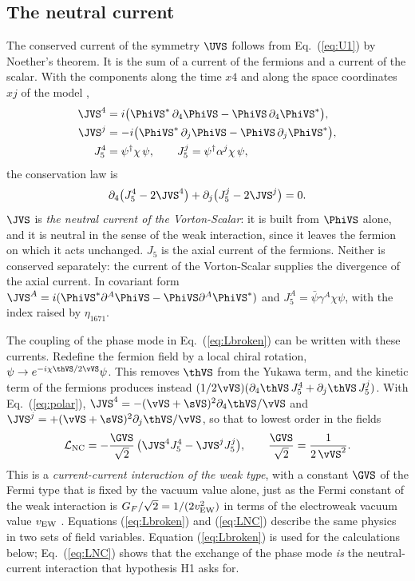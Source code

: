 \subsection{The neutral current}
\label{sec:nc}

The conserved current of the symmetry $\UVS$ follows from Eq.~(\ref{eq:U1}) by Noether's theorem. It
is the sum of a current of the fermions and a current of the scalar. With the components along the
time $x4$ and along the space coordinates $xj$ of the model
,
\begin{align}
\JVS^4&=i\big(\PhiVS^{*}\,\partial_4\PhiVS-\PhiVS\,\partial_4\PhiVS^{*}\big),\nonumber\\
\JVS^j&=-i\big(\PhiVS^{*}\,\partial_j\PhiVS-\PhiVS\,\partial_j\PhiVS^{*}\big),\nonumber\\
J_5^4&=\psi^\dagger\chi\,\psi,\qquad J_5^j=\psi^\dagger\alpha^j\chi\,\psi,
\label{eq:currents}
\end{align}
the conservation law is
\begin{equation}
\partial_4\big(J_5^4-2\JVS^4\big)+\partial_j\big(J_5^j-2\JVS^j\big)=0 .
\label{eq:conservation}
\end{equation}
$\JVS$ is \emph{the neutral current of the Vorton-Scalar}: it is built from $\PhiVS$ alone, and it is
neutral in the sense of the weak interaction, since it leaves the fermion on which it acts unchanged.
$J_5$ is the axial current of the fermions. Neither is conserved separately: the current of the
Vorton-Scalar supplies the divergence of the axial current.
In covariant form $\JVS^A=i(\PhiVS^{*}\partial^A\PhiVS-\PhiVS\partial^A\PhiVS^{*})$ and
$J_5^A=\bar\psi\gamma^A\chi\psi$, with the index raised by $\eta_{1671}$.

The coupling of the phase mode in Eq.~(\ref{eq:Lbroken}) can be written with these currents. Redefine
the fermion field by a local chiral rotation, $\psi\to e^{-i\chi\thVS/2\vVS}\psi$. This removes
$\thVS$ from the Yukawa term, and the kinetic term of the fermions produces instead
$(1/2\vVS)(\partial_4\thVS\,J_5^4+\partial_j\thVS\,J_5^j)$. With Eq.~(\ref{eq:polar}),
$\JVS^4=-(\vVS+\sVS)^2\partial_4\thVS/\vVS$ and $\JVS^j=+(\vVS+\sVS)^2\partial_j\thVS/\vVS$, so that to
lowest order in the fields
\begin{equation}
\mathcal L_{\rm NC}=-\frac{\GVS}{\sqrt2}\,\big(\JVS^4J_5^4-\JVS^jJ_5^j\big),\qquad\frac{\GVS}{\sqrt2}=\frac{1}{2\,\vVS^{2}}.
\label{eq:LNC}
\end{equation}
This is a \emph{current-current interaction of the weak type}, with a constant $\GVS$ of the Fermi type
that is fixed by the vacuum value alone, just as the Fermi constant of the weak interaction is
$G_F/\sqrt2=1/(2v_{\rm EW}^2)$ in terms of the electroweak vacuum value $v_{\rm EW}$
\cite{Weinberg1967}. Equations (\ref{eq:Lbroken}) and (\ref{eq:LNC}) describe the same physics in two
sets of field variables. Equation (\ref{eq:Lbroken}) is used for the calculations below;
Eq.~(\ref{eq:LNC}) shows that the exchange of the phase mode \emph{is} the neutral-current interaction
that hypothesis H1 asks for.

